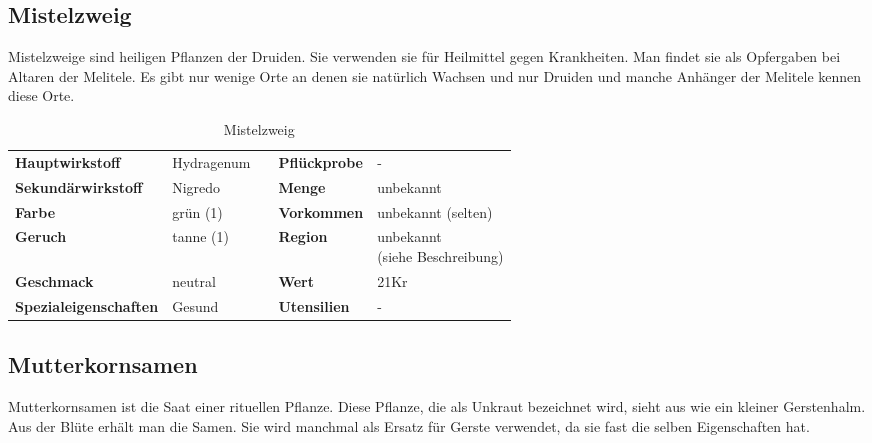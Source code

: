 \subsection{Mistelzweig}
Mistelzweige sind heiligen Pflanzen der Druiden. Sie verwenden sie für Heilmittel gegen Krankheiten. Man findet sie als Opfergaben bei Altaren der Melitele. Es gibt nur wenige Orte an denen sie natürlich Wachsen und nur Druiden und manche Anhänger der Melitele kennen diese Orte.

\begin{table}[h] 
\begin{center} 
\begin{tabular}{|l|l|p{1cm}|l|l|} 
  	\cline{1-2} \cline{4-5} 
  	\textbf{Hauptwirkstoff} & Hydragenum && \textbf{Pflückprobe} & - \\ \cline{1-2} \cline{4-5} 
  	\textbf{Sekundärwirkstoff} & Nigredo && \textbf{Menge} & unbekannt \\ \cline{1-2} \cline{4-5} 
  	\textbf{Farbe} & grün (1) && \textbf{Vorkommen} & unbekannt (selten) \\ \cline{1-2} \cline{4-5} 
  	\textbf{Geruch} & tanne (1) && \textbf{Region} & \brcell{unbekannt \\ (siehe Beschreibung)} \\ \cline{1-2} \cline{4-5} 
  	\textbf{Geschmack} & neutral && \textbf{Wert} & 21Kr \\ \cline{1-2} \cline{4-5} 
  	\textbf{Spezialeigenschaften} & Gesund && \textbf{Utensilien} & - \\ \cline{1-2} \cline{4-5} 
\end{tabular} 
\end{center} 
\caption{Mistelzweig} 
\label{tab:mistelzweig} 
\end{table}

\subsection{Mutterkornsamen}
Mutterkornsamen ist die Saat einer rituellen Pflanze. Diese Pflanze, die als Unkraut bezeichnet wird, sieht aus wie ein kleiner Gerstenhalm. Aus der Blüte erhält man die Samen. Sie wird manchmal als Ersatz für Gerste verwendet, da sie fast die selben Eigenschaften hat.

